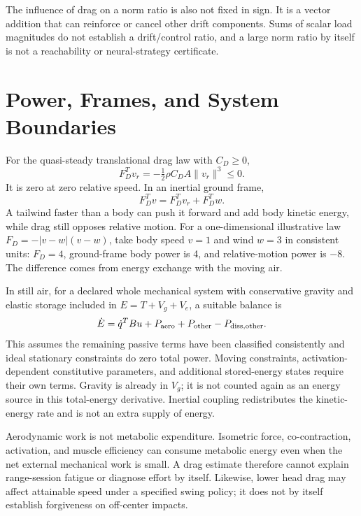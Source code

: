The influence of drag on a norm ratio is also not fixed in sign. It is a vector
addition that can reinforce or cancel other drift components. Sums of scalar
load magnitudes do not establish a drift/control ratio, and a large norm ratio
by itself is not a reachability or neural-strategy certificate.

\section{Power, Frames, and System Boundaries}

For the quasi-steady translational drag law with $C_D\geq0$,
\begin{equation}
 F_D^Tv_r=-\tfrac12\rho C_DA\|v_r\|^3\leq0.
 \label{eq:drag-power}
\end{equation}
It is zero at zero relative speed. In an inertial ground frame,
\begin{equation}
 F_D^Tv=F_D^Tv_r+F_D^Tw.
 \label{eq:wind_power}
\end{equation}
A tailwind faster than a body can push it forward and add body kinetic energy,
while drag still opposes relative motion. For a one-dimensional illustrative
law $F_D=-|v-w|(v-w)$, take body speed $v=1$ and wind $w=3$ in consistent
units: $F_D=4$, ground-frame body power is 4, and relative-motion power is
$-8$. The difference comes from energy exchange with the moving air.

In still air, for a declared whole mechanical system with conservative gravity
and elastic storage included in $E=T+V_g+V_e$, a suitable balance is
\begin{equation}
 \dot E=\dot q^TBu+P_{\rm aero}+P_{\rm other}-P_{\rm diss,other}.
 \label{eq:energy-balance}
\end{equation}
This assumes the remaining passive terms have been classified consistently and
ideal stationary constraints do zero total power. Moving constraints,
activation-dependent constitutive parameters, and additional stored-energy
states require their own terms. Gravity is already in $V_g$; it is not counted
again as an energy source in this total-energy derivative. Inertial coupling
redistributes the kinetic-energy rate and is not an extra supply of energy.

Aerodynamic work is not metabolic expenditure. Isometric force, co-contraction,
activation, and muscle efficiency can consume metabolic energy even when the
net external mechanical work is small. A drag estimate therefore cannot explain
range-session fatigue or diagnose effort by itself. Likewise, lower head drag
may affect attainable speed under a specified swing policy; it does not by
itself establish forgiveness on off-center impacts.

